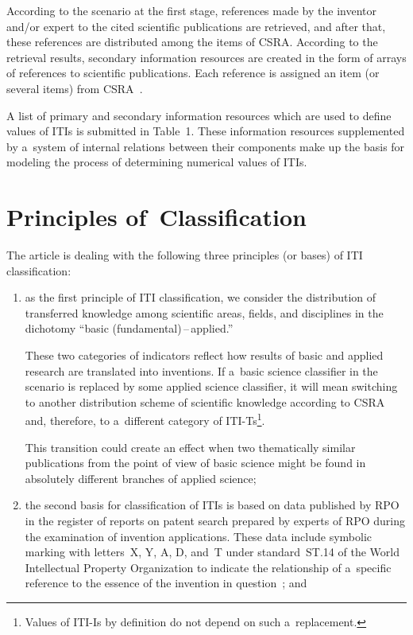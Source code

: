 \begin{multicols}{2}
    According to the scenario at the first stage, references made by the inventor 
and/or expert to the cited scientific publications are retrieved, and after that, these 
references are distributed among the items of CSRA. According to the retrieval 
results, secondary information resources are created in the form of arrays of 
references to scientific publications. Each reference is assigned an item (or several 
items) from CSRA~\cite{15-zat}.
    
    A list of primary and secondary information resources which are used to define 
values of ITIs is submitted in Table~1. These information resources supplemented by 
a~system of internal relations between their components make up the basis for 
modeling the process of determining numerical values of ITIs.
    

\section*{Principles of~Classification}

\noindent
    The article is dealing with the following three principles (or bases) of ITI 
classification:
    \begin{enumerate}[(1)]
    \item as the first principle of ITI classification, we consider the distribution of 
transferred knowledge among scientific areas, fields, and disciplines in the dichotomy 
``basic (fundamental)\,--\,applied.''
    
    These two categories of indicators reflect how results of basic and applied 
research are translated into inventions. If a~basic science classifier in the scenario is 
replaced by some applied science classifier, it will mean switching to another 
distribution scheme of scientific knowledge according to CSRA and, therefore, to 
a~different category of ITI-Ts\footnote{Values of ITI-Is by definition do not depend 
on such a~replacement.}.
    
    This transition could create an effect when two thematically similar publications 
from the point of view of basic science might be found in absolutely different 
branches of applied science;
    
    \item the second basis for classification of ITIs is based on data published by 
RPO in the register of reports on patent search prepared by experts of RPO during 
the examination of invention applications. These data include symbolic marking with 
letters~X, Y, A, D, and~T under standard~ST.14 of the World Intellectual Property 
Organization to indicate the relationship of a~specific reference to the 
essence of the invention in question~\cite{24-zat}; and
    

\end{enumerate}
\end{multicols}

